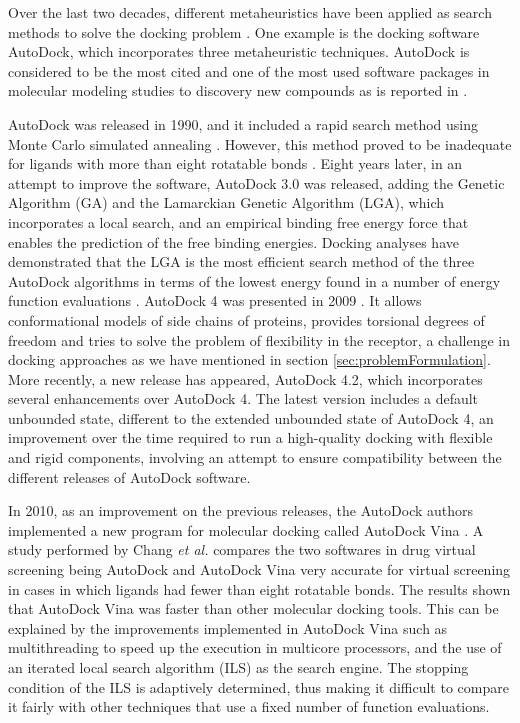 Over the last two decades, different metaheuristics have been applied as search methods to solve the docking problem \cite{Lameijer2005}. One example is the docking software AutoDock, which incorporates three metaheuristic techniques. AutoDock is considered to be the most cited and one of the most used software packages in molecular modeling studies to discovery new compounds \cite{Sousa2006} as is reported in \cite{Cosconati2010}.

AutoDock was released in 1990, and it included a rapid search method using Monte Carlo simulated annealing \cite{Goodsell1990}. However, this method proved to be inadequate for ligands with more than eight rotatable bonds \cite{Morris1998}. Eight years later, in an attempt to improve the software, AutoDock 3.0 was released, adding the Genetic Algorithm (GA) and the Lamarckian Genetic Algorithm (LGA), which incorporates a local search, and an empirical binding free energy force that enables the prediction of the free binding energies. Docking analyses have demonstrated that the LGA is the most efficient search method of the three AutoDock algorithms in terms of the lowest energy found in a number of energy function evaluations \cite{Morris1998}. AutoDock 4 was presented in 2009 \cite{Morris2009}. It allows conformational models of side chains of proteins, provides torsional degrees of freedom and tries to solve the problem of flexibility in the receptor, a challenge in docking approaches as we have mentioned in section \ref{sec:problemFormulation}. More recently, a new release has appeared, AutoDock 4.2, which incorporates several enhancements over AutoDock 4. The latest version includes a default unbounded state, different to the extended unbounded state of AutoDock 4, an improvement over the time required to run a high-quality docking with flexible and rigid components, involving an attempt to ensure compatibility between the different releases of AutoDock software.

In 2010, as an improvement on the previous releases, the AutoDock authors implemented a new program for molecular docking called AutoDock Vina \cite{Trott2010}. A study performed by Chang \emph{et al.} \cite{Chan2007} compares the two softwares in drug virtual screening being AutoDock and AutoDock Vina very accurate for virtual screening in cases in which ligands had fewer than eight rotatable bonds. The results shown that AutoDock Vina was faster than other molecular docking tools. This can be explained by the improvements implemented in AutoDock Vina such as multithreading to speed up the execution in multicore processors, and the use of an iterated local search algorithm (ILS) as the search engine. The stopping condition of the ILS is adaptively determined, thus making it difficult to compare it fairly with other techniques that use a fixed number of function evaluations.

